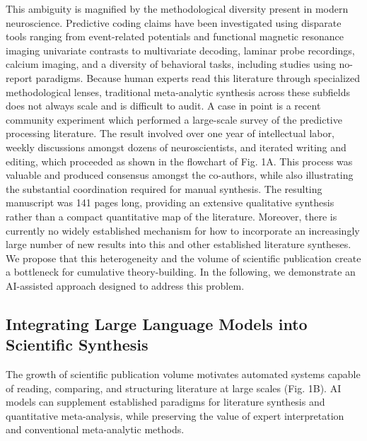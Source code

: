 \documentclass[12pt]{article}
\begin{document}
This ambiguity is magnified by the methodological diversity present in modern neuroscience. Predictive coding claims have been investigated using disparate tools ranging from event-related potentials\cite{ref27} and functional magnetic resonance imaging univariate contrasts\cite{ref28,ref29} to multivariate decoding\cite{ref30,ref31,ref32}, laminar probe recordings\cite{ref24,ref33,ref34}, calcium imaging\cite{ref35,ref36,ref37}, and a diversity of behavioral tasks\cite{ref8,ref24,ref38}, including studies using no-report paradigms\cite{ref34,ref36,ref39}. Because human experts read this literature through specialized methodological lenses, traditional meta-analytic synthesis across these subfields does not always scale and is difficult to audit. A case in point is a recent community experiment which performed a large-scale survey of the predictive processing literature\cite{ref40}. The result involved over one year of intellectual labor, weekly discussions amongst dozens of neuroscientists, and iterated writing and editing, which proceeded as shown in the flowchart of Fig. 1A. This process was valuable and produced consensus amongst the co-authors, while also illustrating the substantial coordination required for manual synthesis. The resulting manuscript was 141 pages long, providing an extensive qualitative synthesis rather than a compact quantitative map of the literature\cite{ref40}. Moreover, there is currently no widely established mechanism for how to incorporate an increasingly large number of new results into this and other established literature syntheses. We propose that this heterogeneity and the volume of scientific publication create a bottleneck for cumulative theory-building. In the following, we demonstrate an AI-assisted approach designed to address this problem.

\subsection{Integrating Large Language Models into Scientific Synthesis}\label{integrating-large-language-models-into-scientific-synthesis}

The growth of scientific publication volume motivates automated systems capable of reading, comparing, and structuring literature at large scales (Fig. 1B). AI models can supplement established paradigms for literature synthesis and quantitative meta-analysis, while preserving the value of expert interpretation and conventional meta-analytic methods.
\end{document}
